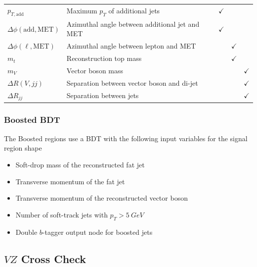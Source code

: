 \documentclass{beamer}
\begin{document}
\begin{frame}
{\begin{tabularx}{\textwidth}{|l|X|c|c|c|}
    $p_{T,\mathrm{add}}$ & Maximum $p_T$ of additional jets & $\checkmark$ & & \\
    $\Delta\phi(\mathrm{add, MET})$ & Azimuthal angle between additional jet and MET & $\checkmark$ & & \\
    \hline
    $\Delta\phi(\ell, \mathrm{MET})$ & Azimuthal angle between lepton and MET & & $\checkmark$ & \\
    $m_t$ & Reconstruction top mass & & $\checkmark$ & \\
    $m_V$ & Vector boson mass & & & $\checkmark$ \\
    \hline
    $\Delta R(V, jj)$ & Separation between vector boson and di-jet & & & $\checkmark$ \\
    $\Delta R_{jj}$ & Separation between jets & & & $\checkmark$ \\
    \hline
  \end{tabularx}
  }

\end{frame}

\begin{frame}
  \frametitle{Boosted BDT}

  The Boosted regions use a BDT with the following input variables for the signal region shape

  \vfill

  \begin{itemize}
  \item Soft-drop mass of the reconstructed fat jet
  \item Transverse momentum of the fat jet
  \item Transverse momentum of the reconstructed vector boson
  \item Number of soft-track jets with $p_T > \SI{5}{GeV}$
  \item Double $b$-tagger output node for boosted jets
  \end{itemize}

\end{frame}

\subsection{$V\!Z$ Cross Check}
\end{document}
